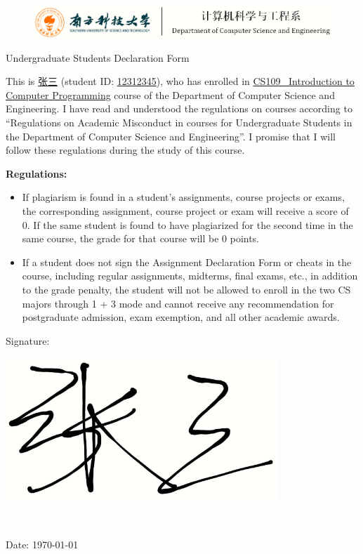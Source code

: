 \documentclass[12pt]{article}
\newcommand{\sname}{张三}  %
\newcommand{\sid}{12312345}  %
\newcommand{\cid}{CS109} %
\newcommand{\cname}{Introduction to Computer Programming}  %
\begin{document}
\begin{figure}[h]
    \centering
    \includegraphics[width=\textwidth]{header.png}
    \label{fig:example}
\end{figure}

\begin{center}
    \Large Undergraduate Students Declaration Form
\end{center}

\vspace{1cm}

This is \underline{\hspace{1cm}\sname\hspace{1cm}} (student ID: \underline{\hspace{1cm}\sid\hspace{1cm}}), who has enrolled in \underline{\hspace{1cm}\cid ~ \cname\hspace{1cm}} course of the Department of Computer Science and Engineering. I have read and understood the regulations on courses according to “Regulations on Academic Misconduct in courses for Undergraduate Students in the Department of Computer Science and Engineering”. I promise that I will follow these regulations during the study of this course.

\vspace{1cm}

\noindent
\textbf{Regulations:}
\begin{itemize}
    \item If plagiarism is found in a student’s assignments, course projects or exams, the corresponding assignment, course project or exam will receive a score of 0. If the same student is found to have plagiarized for the second time in the same course, the grade for that course will be 0 points.
    \item If a student does not sign the Assignment Declaration Form or cheats in the course, including regular assignments, midterms, final exams, etc., in addition to the grade penalty, the student will not be allowed to enroll in the two CS majors through 1 + 3 mode and cannot receive any recommendation for postgraduate admission, exam exemption, and all other academic awards.
\end{itemize}

\vspace{1cm}

\hfill Signature:
\begin{minipage}{2.5cm}
    \includegraphics[height=1.5\baselineskip]{signature.png}
\end{minipage}

~

\hfill Date: \today
\end{document}
